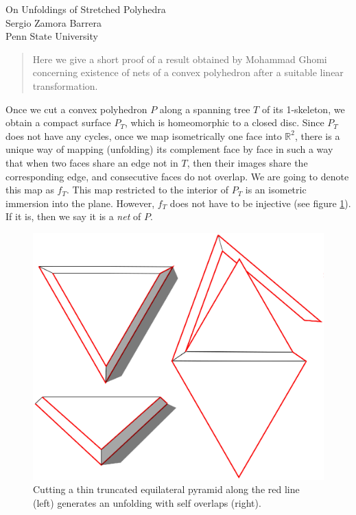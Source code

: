 \documentclass[openright, 12pt]{article}
\newcommand{\field}[1]{\ensuremath{\mathbb{#1}}}
\newcommand{\R}{\field{R}}
\begin{document}
\begin{center}
\Large{On Unfoldings of Stretched Polyhedra}\\
\normalsize{ Sergio Zamora Barrera}\\
Penn State University
\end{center}



\begin{abstract}
\noindent Here we give a short proof of a result obtained by Mohammad Ghomi concerning existence of nets of a convex polyhedron after a suitable linear transformation.

\end{abstract}




Once we cut a convex polyhedron $P$ along a spanning tree $T$ of its 1-skeleton, we obtain a compact surface $P_T$, which is homeomorphic to a closed disc. Since $P_T$ does not have any cycles, once we map isometrically one face into $\R^2$, there is a unique way of mapping (unfolding) its complement face by face in such a way that when two faces share an edge not in $T$, then their images share the corresponding edge, and consecutive faces do not overlap. We are going to denote this map as $f_T$. This map restricted to the interior of $P_T$ is an isometric immersion into the plane. However, $f_T$ does not have to be injective (see figure \ref{Tet}). If it is, then we say it is a \textit{net} of $P$.




\begin{figure}[h]
\centering
\includegraphics[scale=0.5]{Rel.eps}
\caption{Cutting a thin truncated equilateral pyramid along the red line (left) generates an unfolding with self overlaps (right).}\label{Tet}
\end{figure}
\end{document}
